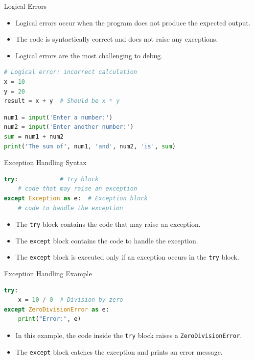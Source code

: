 \begin{frame}[fragile]{Logical Errors}
    \begin{itemize}
        \item Logical errors occur when the program does not produce the expected output.
        \item The code is syntactically correct and does not raise any exceptions.
        \item Logical errors are the most challenging to debug.
    \end{itemize}
    \begin{lstlisting}[language=Python]
# Logical error: incorrect calculation
x = 10
y = 20
result = x + y  # Should be x * y
    \end{lstlisting}
    \begin{lstlisting}[language=Python]
num1 = input('Enter a number:')
num2 = input('Enter another number:')
sum = num1 + num2
print('The sum of', num1, 'and', num2, 'is', sum)
\end{lstlisting}
\end{frame} 

\begin{frame}[fragile]{Exception Handling Syntax}
    \begin{lstlisting}[language=Python]
try:            # Try block
    # code that may raise an exception
except Exception as e:  # Exception block
    # code to handle the exception
    \end{lstlisting}
    \begin{itemize}
        \item The \texttt{try} block contains the code that may raise an exception.
        \item The \texttt{except} block contains the code to handle the exception.
        \item The \texttt{except} block is executed only if an exception occurs in the \texttt{try} block.
    \end{itemize}
\end{frame}

\begin{frame}[fragile]{Exception Handling Example}
    \begin{lstlisting}[language=Python]
try:
    x = 10 / 0  # Division by zero
except ZeroDivisionError as e:
    print("Error:", e)
    \end{lstlisting}
    \begin{itemize}
        \item In this example, the code inside the \texttt{try} block raises a \texttt{ZeroDivisionError}.
        \item The \texttt{except} block catches the exception and prints an error message.
    \end{itemize}
\end{frame} 

